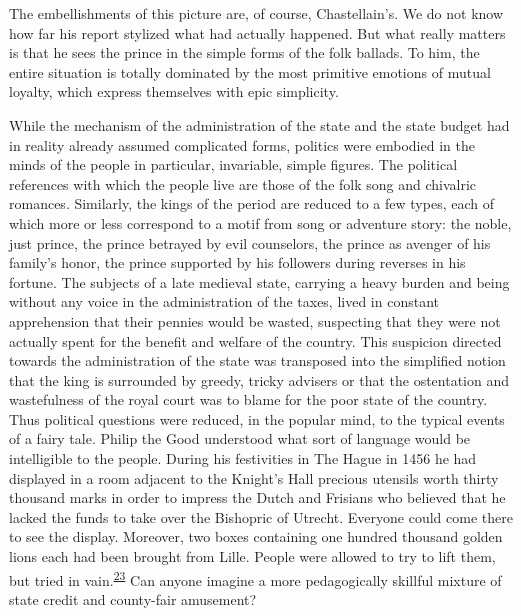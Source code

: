 The embellishments of this picture are, of course, Chastellain's. We do
not know how far his report stylized what had actually happened. But
what really matters is that he sees the prince in the simple forms of
the folk ballads. To him, the entire situation is totally dominated by
the most primitive emotions of mutual loyalty, which express themselves
with epic simplicity.

While the mechanism of the administration of the state and the state
budget had in reality already assumed complicated forms, politics were
embodied in the minds of the people in particular, invariable, simple
figures. The political references with which the people live are those
of the folk song and chivalric romances. Similarly, the kings of the
period are reduced to a few types, each of which more or less correspond
to a motif from song or adventure story: the noble, just prince, the
prince betrayed by evil counselors, the prince as avenger of his
family's honor, the prince supported by his followers during reverses in
his fortune. The subjects of a late medieval state, carrying a heavy
burden and being without any voice in the administration of the taxes,
lived in constant apprehension that their pennies would be wasted,
suspecting that they were not actually spent for the benefit and welfare
of the country. This suspicion directed towards the administration of
the state was transposed into the simplified notion that the king is
surrounded by greedy, tricky advisers or that the ostentation and
wastefulness of the royal court was to blame for the poor state of the
country. Thus political questions were reduced, in the popular mind, to
the typical events of a fairy tale. Philip the Good understood what sort
of language would be intelligible to the people. During his
festivi\protect\hypertarget{08_Chapter_One__THE_PASSIONATE_INTE.xhtmlux5cux23page_11}{}{}ties
in The Hague in 1456 he had displayed in a room adjacent to the Knight's
Hall precious utensils worth thirty thousand marks in order to impress
the Dutch and Frisians who believed that he lacked the funds to take
over the Bishopric of Utrecht. Everyone could come there to see the
display. Moreover, two boxes containing one hundred thousand golden
lions each had been brought from Lille. People were allowed to try to
lift them, but tried in
vain.\textsuperscript{\protect\hypertarget{08_Chapter_One__THE_PASSIONATE_INTE.xhtmlux5cux23id_2185}{\protect\hyperlink{23_NOTES.xhtmlux5cux23page_399}{23}}}
Can anyone imagine a more pedagogically skillful mixture of state credit
and county-fair amusement?

